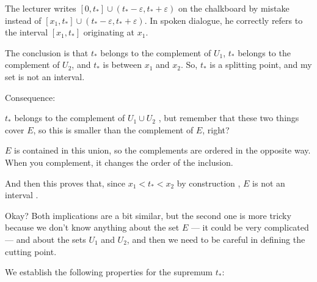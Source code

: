 \begin{proofWrapper}
\begin{aiNote}
The lecturer writes $[0, t_*] \cup (t_* - \varepsilon, t_* + \varepsilon)$ on the chalkboard by mistake instead of $[x_1, t_*] \cup (t_* - \varepsilon, t_* + \varepsilon)$. In spoken dialogue, he correctly refers to the interval $[x_1, t_*]$ originating at $x_1$.
\end{aiNote}

\begin{speech}[00:19:25 - 00:20:33]
The conclusion is that $t_*$ belongs to the complement of $U_1$, $t_*$ belongs to the complement of $U_2$, and $t_*$ is between $x_1$ and $x_2$. So, $t_*$ is a splitting point, and my set is not an interval.

Consequence: 

$t_*$ belongs to the complement of $U_1 \cup U_2$ , but remember that these two things cover $E$, so this is smaller than the complement of $E$, right? 

$E$ is contained in this union, so the complements are ordered in the opposite way. When you complement, it changes the order of the inclusion.

And then this proves that, since $x_1 < t_* < x_2$ by construction , $E$ is not an interval .

Okay? Both implications are a bit similar, but the second one is more tricky because we don't know anything about the set $E$ --- it could be very complicated --- and about the sets $U_1$ and $U_2$, and then we need to be careful in defining the cutting point.
\end{speech}

\begin{content}
We establish the following properties for the supremum $t_*$:


\end{content}
\end{proofWrapper}
